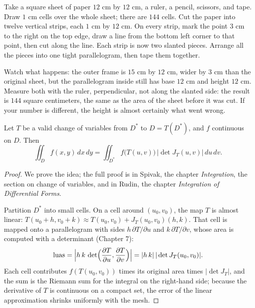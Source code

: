 \begin{tangan}
Take a square sheet of paper $12$ cm by $12$ cm, a ruler, a pencil, scissors, and
tape. Draw $1$ cm cells over the whole sheet; there are $144$ cells. Cut the paper
into twelve vertical strips, each $1$ cm by $12$ cm. On every
strip, mark the point $3$ cm to the right on the top edge, draw a line from the bottom left
corner to that point, then cut along the line. Each strip is now two slanted
pieces. Arrange all the pieces into one tight parallelogram, then
tape them together.

Watch what happens: the outer frame is $15$ cm by $12$ cm, wider by $3$ cm
than the original sheet, but the parallelogram inside still has base
$12$ cm and height $12$ cm. Measure both with the ruler, perpendicular, not
along the slanted side: the result is $144$ square centimeters, the same as the area of the sheet
before it was cut. If your number is different, the height is almost certainly what went wrong.
\end{tangan}

\begin{teorema}
 Let $T$ be a valid change of variables
from $D^{*}$ to $D=T(D^{*})$, and $f$ continuous on $D$. Then
\[
\iint_{D}f(x,y)\,dx\,dy
=\iint_{D^{*}} f\bigl(T(u,v)\bigr)\,\bigl|\det J_{T}(u,v)\bigr|\,du\,dv .
\]
\end{teorema}

\begin{proof}
We prove the idea; the full proof is in Spivak, the chapter \emph{Integration},
the section on change of variables, and in Rudin, the chapter \emph{Integration of Differential
Forms}.

Partition $D^{*}$ into small cells. On a cell around $(u_{0},v_{0})$,
the map $T$ is almost linear: $T(u_{0}+h,v_{0}+k)\approx
T(u_{0},v_{0})+J_{T}(u_{0},v_{0})(h,k)$. That cell is mapped onto a
parallelogram with sides $h\,\partial T/\partial u$ and $k\,\partial T/\partial v$,
whose area is computed with a determinant (Chapter 7):
\[
\mathrm{luas}
=\Bigl|h\,k\,\det\Bigl(\frac{\partial T}{\partial u},
\frac{\partial T}{\partial v}\Bigr)\Bigr|
=|h\,k|\,|\det J_{T}(u_{0},v_{0})| .
\]
Each cell contributes $f(T(u_{0},v_{0}))$ times its original area times
$|\det J_{T}|$, and the sum is the Riemann sum for the integral on the right-hand
side; because the derivative of $T$ is continuous on a compact set, the error of the linear
approximation shrinks uniformly with the mesh.
\end{proof}

